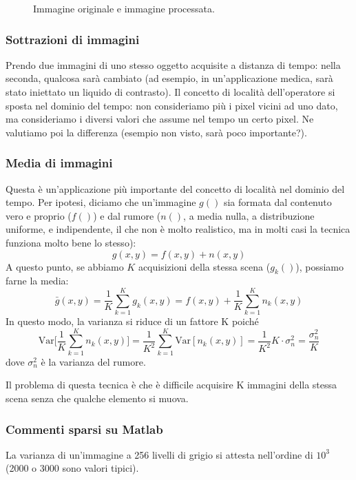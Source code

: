 \documentclass[a4paper,11pt]{article}
\begin{document}
\begin{figure}[!h]
\begin{subfigure}{.5\textwidth}
\end{subfigure}
\caption{Immagine originale e immagine processata.}
\end{figure}

\subsubsection{Sottrazioni di immagini}
Prendo due immagini di uno stesso oggetto acquisite a distanza di tempo: nella seconda, qualcosa sarà cambiato (ad esempio,
in un'applicazione medica, sarà stato iniettato un liquido di contrasto). Il concetto di località dell'operatore si sposta nel dominio del tempo:
non consideriamo più i pixel vicini ad uno dato, ma consideriamo i diversi valori che assume nel tempo un certo pixel. Ne valutiamo poi la differenza
(esempio non visto, sarà poco importante?).

\subsubsection{Media di immagini}
Questa è un'applicazione più importante del concetto di località nel dominio del tempo. Per ipotesi, diciamo che un'immagine $g()$ sia formata dal contenuto
vero e proprio ($f()$) e dal rumore ($n()$, a media nulla, a distribuzione uniforme, e indipendente, il che non è molto realistico,
ma in molti casi la tecnica funziona molto bene lo stesso):
\[
g(x,y) = f(x,y) + n(x,y)
\]
A questo punto, se abbiamo $K$ acquisizioni della stessa scena ($g_k()$), possiamo farne la media:
\[
\bar{g}(x,y) = \frac{1}{K} \sum_{k=1}^{K} g_k(x,y) = f(x,y) + \frac{1}{K} \sum_{k=1}^{K} n_k(x,y)
\]
In questo modo, la varianza si riduce di un fattore K poiché
\[
\text{Var}\Bigg[\frac{1}{K} \sum_{k=1}^{K} n_k(x,y)\Bigg] = \frac{1}{K^2} \sum_{k=1}^{K} \text{Var}[n_k(x,y)] = \frac{1}{K^2} K \cdot \sigma^2_n = \frac{\sigma^2_n}{K}
\]
dove $\sigma^2_n$ è la varianza del rumore.
\par
Il problema di questa tecnica è che è difficile acquisire K immagini della stessa scena senza che qualche elemento si muova.

\subsubsection{Commenti sparsi su Matlab}
La varianza di un'immagine a 256 livelli di grigio si attesta nell'ordine di $10^3$ (2000 o 3000 sono valori tipici).
\end{document}
